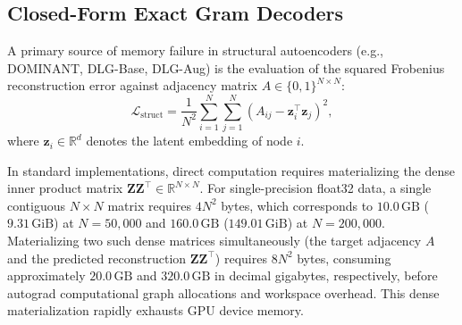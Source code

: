 \documentclass[applsci,article,submit,moreauthors,pdftex]{Definitions/mdpi}
\begin{document}
\subsection{Closed-Form Exact Gram Decoders}
A primary source of memory failure in structural autoencoders (e.g., DOMINANT, DLG-Base, DLG-Aug) is the evaluation of the squared Frobenius reconstruction error against adjacency matrix $A \in \{0, 1\}^{N \times N}$:
\begin{equation}
\mathcal{L}_{\mathrm{struct}} = \frac{1}{N^2} \sum_{i=1}^N \sum_{j=1}^N \left(A_{ij} - \mathbf{z}_i^\top \mathbf{z}_j\right)^2,
\label{eq:dense_loss}
\end{equation}
where $\mathbf{z}_i \in \mathbb{R}^d$ denotes the latent embedding of node $i$. 

In standard implementations, direct computation requires materializing the dense inner product matrix $\mathbf{Z} \mathbf{Z}^\top \in \mathbb{R}^{N \times N}$. For single-precision float32 data, a single contiguous $N \times N$ matrix requires $4 N^2$ bytes, which corresponds to $10.0\,\mathrm{GB}$ ($9.31\,\mathrm{GiB}$) at $N=50,000$ and $160.0\,\mathrm{GB}$ ($149.01\,\mathrm{GiB}$) at $N=200,000$. Materializing two such dense matrices simultaneously (the target adjacency $A$ and the predicted reconstruction $\mathbf{Z} \mathbf{Z}^\top$) requires $8 N^2$ bytes, consuming approximately $20.0\,\mathrm{GB}$ and $320.0\,\mathrm{GB}$ in decimal gigabytes, respectively, before autograd computational graph allocations and workspace overhead. This dense materialization rapidly exhausts GPU device memory.
\end{document}
